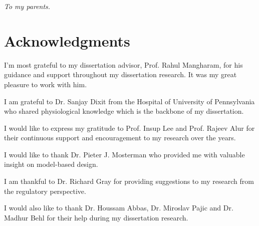 \documentclass[12pt,letterpaper]{report}
\theoremstyle{definition}
\theoremstyle{remark}
\numberwithin{equation}{chapter}
\theoremstyle{plain} %
\begin{document}
\newpage
\begin{center}
\vspace*{\fill}
\it{To my parents.}
\vspace*{\fill}
\end{center}


\newpage
{}
{}
\chapter*{Acknowledgments}
%
I'm most grateful to my dissertation advisor, Prof. Rahul Mangharam, for his guidance and support throughout my dissertation research.
It was my great pleasure to work with him.

I am grateful to Dr. Sanjay Dixit from the Hospital of University of Pennsylvania who shared physiological knowledge which is the backbone of my dissertation.

I would like to express my gratitude to Prof. Insup Lee and Prof. Rajeev Alur for their continuous support and encouragement to my research over the years.

I would like to thank Dr. Pieter J. Mosterman who provided me with valuable insight on model-based design.

I am thankful to Dr. Richard Gray for providing suggestions to my research from the regulatory perspective.

I would also like to thank Dr. Houssam Abbas, Dr. Miroslav Pajic and Dr. Madhur Behl for their help during my dissertation research.
\end{document}
